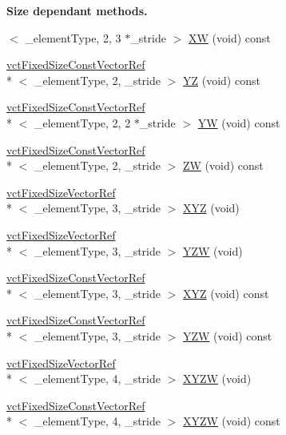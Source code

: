 \begin{Indent}{\bf Size dependant methods.}
\begin{DoxyCompactItemize}
$<$ \-\_\-element\-Type, 2, 3 $\ast$\-\_\-stride $>$ \hyperlink{classvct_fixed_size_vector_base_a2585bb2eeb588b29daec3be755fd86af}{X\-W} (void) const 
\item 
\hyperlink{classvct_fixed_size_const_vector_ref}{vct\-Fixed\-Size\-Const\-Vector\-Ref}\\*
$<$ \-\_\-element\-Type, 2, \-\_\-stride $>$ \hyperlink{classvct_fixed_size_vector_base_a72afb171290b48a55e9effb6a34347e1}{Y\-Z} (void) const 
\item 
\hyperlink{classvct_fixed_size_const_vector_ref}{vct\-Fixed\-Size\-Const\-Vector\-Ref}\\*
$<$ \-\_\-element\-Type, 2, 2 $\ast$\-\_\-stride $>$ \hyperlink{classvct_fixed_size_vector_base_ae472ae08cc0602f69f7a49201fe12375}{Y\-W} (void) const 
\item 
\hyperlink{classvct_fixed_size_const_vector_ref}{vct\-Fixed\-Size\-Const\-Vector\-Ref}\\*
$<$ \-\_\-element\-Type, 2, \-\_\-stride $>$ \hyperlink{classvct_fixed_size_vector_base_aa026d242ae79807f38ca54f59dc90504}{Z\-W} (void) const 
\item 
\hyperlink{classvct_fixed_size_vector_ref}{vct\-Fixed\-Size\-Vector\-Ref}\\*
$<$ \-\_\-element\-Type, 3, \-\_\-stride $>$ \hyperlink{classvct_fixed_size_vector_base_a8a283be2498c65116ce551e71c6dadfb}{X\-Y\-Z} (void)
\item 
\hyperlink{classvct_fixed_size_vector_ref}{vct\-Fixed\-Size\-Vector\-Ref}\\*
$<$ \-\_\-element\-Type, 3, \-\_\-stride $>$ \hyperlink{classvct_fixed_size_vector_base_ad4b9e4ec9c132076bb899296b094a705}{Y\-Z\-W} (void)
\item 
\hyperlink{classvct_fixed_size_const_vector_ref}{vct\-Fixed\-Size\-Const\-Vector\-Ref}\\*
$<$ \-\_\-element\-Type, 3, \-\_\-stride $>$ \hyperlink{classvct_fixed_size_vector_base_ab77a874521230b89783b9b19fd8fa8f4}{X\-Y\-Z} (void) const 
\item 
\hyperlink{classvct_fixed_size_const_vector_ref}{vct\-Fixed\-Size\-Const\-Vector\-Ref}\\*
$<$ \-\_\-element\-Type, 3, \-\_\-stride $>$ \hyperlink{classvct_fixed_size_vector_base_a50b8f1a728b7f19796d3e54fa21e46cc}{Y\-Z\-W} (void) const 
\item 
\hyperlink{classvct_fixed_size_vector_ref}{vct\-Fixed\-Size\-Vector\-Ref}\\*
$<$ \-\_\-element\-Type, 4, \-\_\-stride $>$ \hyperlink{classvct_fixed_size_vector_base_a2b501e1d45bb2c11c3cee080eb0c99a4}{X\-Y\-Z\-W} (void)
\item 
\hyperlink{classvct_fixed_size_const_vector_ref}{vct\-Fixed\-Size\-Const\-Vector\-Ref}\\*
$<$ \-\_\-element\-Type, 4, \-\_\-stride $>$ \hyperlink{classvct_fixed_size_vector_base_a5b426a600ede9f507c49c9f21e5845d3}{X\-Y\-Z\-W} (void) const 
\end{DoxyCompactItemize}
\end{Indent}
